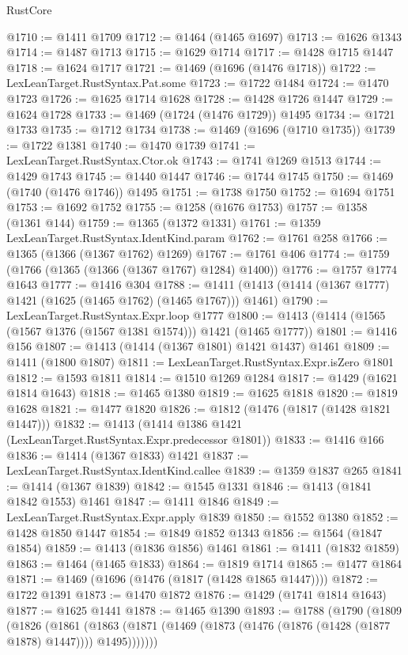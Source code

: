 \begin{lexlean}{RustCore}
\begin{coremodule}
{\begin{coremodule}
{{{{{{{{{{{{{{{{{{{{{{{{{{{{{{{{{{{{{{{{{{{{{{{@1710 := @1411 @1709
@1712 := @1464 (@1465 @1697)
@1713 := @1626 @1343
@1714 := @1487 @1713
@1715 := @1629 @1714
@1717 := @1428 @1715 @1447
@1718 := @1624 @1717
@1721 := @1469 (@1696 (@1476 @1718))
@1722 := LexLeanTarget.RustSyntax.Pat.some
@1723 := @1722 @1484
@1724 := @1470 @1723
@1726 := @1625 @1714 @1628
@1728 := @1428 @1726 @1447
@1729 := @1624 @1728
@1733 := @1469 (@1724 (@1476 @1729)) @1495
@1734 := @1721 @1733
@1735 := @1712 @1734
@1738 := @1469 (@1696 (@1710 @1735))
@1739 := @1722 @1381
@1740 := @1470 @1739
@1741 := LexLeanTarget.RustSyntax.Ctor.ok
@1743 := @1741 @1269 @1513
@1744 := @1429 @1743
@1745 := @1440 @1447
@1746 := @1744 @1745
@1750 := @1469 (@1740 (@1476 @1746)) @1495
@1751 := @1738 @1750
@1752 := @1694 @1751
@1753 := @1692 @1752
@1755 := @1258 (@1676 @1753)
@1757 := @1358 (@1361 @144)
@1759 := @1365 (@1372 @1331)
@1761 := @1359 LexLeanTarget.RustSyntax.IdentKind.param
@1762 := @1761 @258
@1766 := @1365 (@1366 (@1367 @1762) @1269)
@1767 := @1761 @406
@1774 := @1759 (@1766 (@1365 (@1366 (@1367 @1767) @1284) @1400))
@1776 := @1757 @1774 @1643
@1777 := @1416 @304
@1788 := @1411 (@1413 (@1414 (@1367 @1777) @1421 (@1625 (@1465 @1762) (@1465 @1767))) @1461)
@1790 := LexLeanTarget.RustSyntax.Expr.loop @1777
@1800 := @1413 (@1414 (@1565 (@1567 @1376 (@1567 @1381 @1574))) @1421 (@1465 @1777))
@1801 := @1416 @156
@1807 := @1413 (@1414 (@1367 @1801) @1421 @1437) @1461
@1809 := @1411 (@1800 @1807)
@1811 := LexLeanTarget.RustSyntax.Expr.isZero @1801
@1812 := @1593 @1811
@1814 := @1510 @1269 @1284
@1817 := @1429 (@1621 @1814 @1643)
@1818 := @1465 @1380
@1819 := @1625 @1818
@1820 := @1819 @1628
@1821 := @1477 @1820
@1826 := @1812 (@1476 (@1817 (@1428 @1821 @1447)))
@1832 := @1413 (@1414 @1386 @1421 (LexLeanTarget.RustSyntax.Expr.predecessor @1801))
@1833 := @1416 @166
@1836 := @1414 (@1367 @1833) @1421
@1837 := LexLeanTarget.RustSyntax.IdentKind.callee
@1839 := @1359 @1837 @265
@1841 := @1414 (@1367 @1839)
@1842 := @1545 @1331
@1846 := @1413 (@1841 @1842 @1553) @1461
@1847 := @1411 @1846
@1849 := LexLeanTarget.RustSyntax.Expr.apply @1839
@1850 := @1552 @1380
@1852 := @1428 @1850 @1447
@1854 := @1849 @1852 @1343
@1856 := @1564 (@1847 @1854)
@1859 := @1413 (@1836 @1856) @1461
@1861 := @1411 (@1832 @1859)
@1863 := @1464 (@1465 @1833)
@1864 := @1819 @1714
@1865 := @1477 @1864
@1871 := @1469 (@1696 (@1476 (@1817 (@1428 @1865 @1447))))
@1872 := @1722 @1391
@1873 := @1470 @1872
@1876 := @1429 (@1741 @1814 @1643)
@1877 := @1625 @1441
@1878 := @1465 @1390
@1893 := @1788
    (@1790
      (@1809
        (@1826
          (@1861
            (@1863 (@1871 (@1469 (@1873 (@1476 (@1876 (@1428 (@1877 @1878) @1447)))) @1495)))))))
}}}}}}}}}}}}}}}}}}}}}}}}}}}}}}}}}}}}}}}}}}}}}}}
\end{coremodule}}
\end{coremodule}
\end{lexlean}

